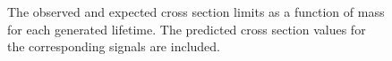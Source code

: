 \begin{figure}
\\
\\
\caption{The observed and expected cross section limits as a function of mass for each generated lifetime. The predicted cross section values for the corresponding signals are included.}
\label{fig:xsec_limit_metastable}
\end{figure}



